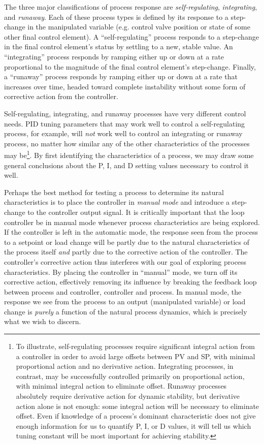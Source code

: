 \vskip 10pt

The three major classifications of process response are \textit{self-regulating}, \textit{integrating}, and \textit{runaway}.  Each of these process types is defined by its response to a step-change in the manipulated variable (e.g. control valve position or state of some other final control element).  A ``self-regulating'' process responds to a step-change in the final control element's status by settling to a new, stable value.  An ``integrating'' process responds by ramping either up or down at a rate proportional to the magnitude of the final control element's step-change.  Finally, a ``runaway'' process responds by ramping either up or down at a rate that increases over time, headed toward complete instability without some form of corrective action from the controller.

Self-regulating, integrating, and runaway processes have very different control needs.  PID tuning parameters that may work well to control a self-regulating process, for example, will \textit{not} work well to control an integrating or runaway process, no matter how similar any of the other characteristics of the processes may be\footnote{To illustrate, self-regulating processes require significant integral action from a controller in order to avoid large offsets between PV and SP, with minimal proportional action and no derivative action.  Integrating processes, in contrast, may be successfully controlled primarily on proportional action, with minimal integral action to eliminate offset.  Runaway processes absolutely require derivative action for dynamic stability, but derivative action alone is not enough: some integral action will be necessary to eliminate offset.  Even if knowledge of a process's dominant characteristic does not give enough information for us to quantify P, I, or D values, it will tell us which tuning constant will be most important for achieving stability.}.  By first identifying the characteristics of a process, we may draw some general conclusions about the P, I, and D setting values necessary to control it well.

\vskip 10pt

Perhaps the best method for testing a process to determine its natural characteristics is to place the controller in \textit{ manual mode} and introduce a step-change to the controller output signal.  It is critically important that the loop controller be in manual mode whenever process characteristics are being explored.  If the controller is left in the automatic mode, the response seen from the process to a setpoint or load change will be partly due to the natural characteristics of the process itself \textit{and} partly due to the corrective action of the controller.  The controller's corrective action thus interferes with our goal of exploring process characteristics.  By placing the controller in ``manual'' mode, we turn off its corrective action, effectively removing its influence by breaking the feedback loop between process and controller, controller and process.  In manual mode, the response we see from the process to an output (manipulated variable) or load change is \textit{purely} a function of the natural process dynamics, which is precisely what we wish to discern.

